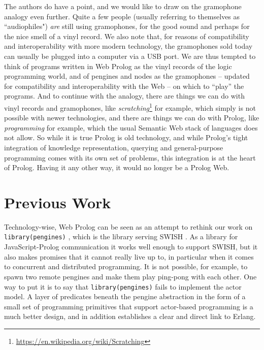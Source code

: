 \documentclass{tlp}
\begin{document}
\noindent The authors do have a point, and we would like to draw on the gramophone analogy even further. Quite a few people (usually referring to themselves as ``audiophiles") \textit{are} still using gramophones, for the good sound and perhaps for the nice smell of a vinyl record. We also note that, for reasons of compatibility and interoperability with more modern technology, the gramophones sold today can usually be plugged into a computer via a USB port. We are thus tempted to think of programs written in Web Prolog as the vinyl records of the logic programming world, and of pengines and nodes as the gramophones -- updated for compatibility and interoperability with the Web -- on which to ``play'' the programs. And to continue with the analogy, there are things we can do with vinyl records and gramophones, like \textit{scratching}\footnote{\url{https://en.wikipedia.org/wiki/Scratching}} for example, which simply is not possible with newer technologies, and there are things we can do with Prolog, like \textit{programming} for example, which the usual Semantic Web stack of languages does not allow. So while it is true Prolog is old technology, and while Prolog's tight integration of knowledge representation, querying and general-purpose programming comes with its own set of problems, this integration is at the heart of Prolog. Having it any other way, it would no longer be a Prolog Web.

\section{Previous Work}\label{sec:previous}

\noindent Technology-wise, Web Prolog can be seen as an attempt to rethink our work on \texttt{library(pengines)} \cite{DBLP:journals/tplp/LagerW14}, which is the library serving SWISH \cite{DBLP:journals/corr/abs-1808-08042}. As a library for JavaScript-Prolog communication it works well enough to support SWISH, but it also makes promises that it cannot really live up to, in particular when it comes to concurrent and distributed programming. It is not possible, for example, to spawn two remote pengines and make them play ping-pong with each other. One way to put it is to say that \texttt{library(pengines)} fails to implement the actor model. %
A layer of predicates beneath the pengine abstraction in the form of a small set of programming primitives that support actor-based programming is a much better design, and in addition establishes a clear and direct link to Erlang.
\end{document}
